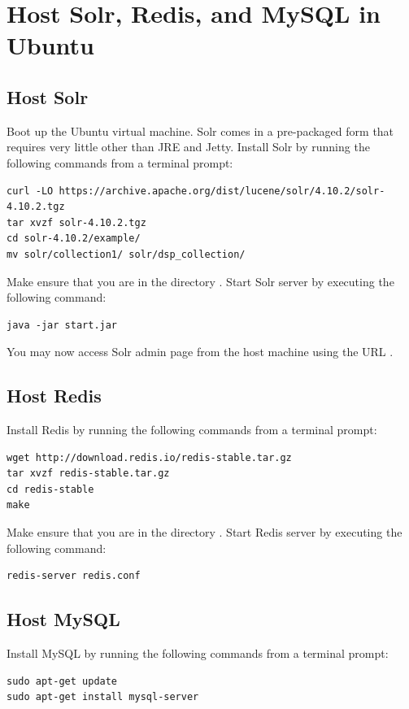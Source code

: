 \section{Host Solr, Redis, and MySQL in Ubuntu}
\label{step:host_servers}
\subsection{Host Solr} 
Boot up the Ubuntu virtual machine. Solr comes in a pre-packaged form that requires very little other than JRE and Jetty. Install Solr by running the following commands from a terminal prompt:
\begin{verbatim}
curl -LO https://archive.apache.org/dist/lucene/solr/4.10.2/solr-4.10.2.tgz
tar xvzf solr-4.10.2.tgz
cd solr-4.10.2/example/
mv solr/collection1/ solr/dsp_collection/
\end{verbatim}

Make ensure that you are in the directory . Start Solr server by executing the following command:
\begin{verbatim}
java -jar start.jar
\end{verbatim}

You may now access Solr admin page from the host machine using the URL .

\subsection{Host Redis} 
Install Redis by running the following commands from a terminal prompt:
\begin{verbatim}
wget http://download.redis.io/redis-stable.tar.gz
tar xvzf redis-stable.tar.gz
cd redis-stable
make
\end{verbatim}

Make ensure that you are in the directory . Start Redis server by executing the following command:
\begin{verbatim}
redis-server redis.conf
\end{verbatim}

\subsection{Host MySQL}
Install MySQL by running the following commands from a terminal prompt:
\begin{verbatim}
sudo apt-get update
sudo apt-get install mysql-server
\end{verbatim}

